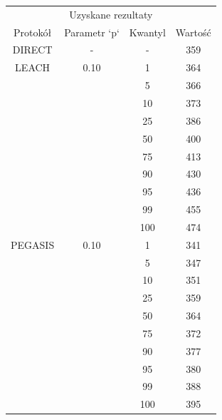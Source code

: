 \documentclass[a4paper,12pt,twoside,openany]{report}
\begin{document}
\begin{longtable}{*{4}{c}}
\toprule
\multicolumn{4}{c}{Uzyskane rezultaty} \\
Protokół	& Parametr `p`	& Kwantyl	& Wartość \\
\midrule
\endhead
DIRECT	& - 	& -	& 359 \\*
\midrule
LEACH	& 0.10	& 1	& 364 \\*
	&	& 5	& 366 \\*
	&	& 10	& 373 \\*
	&	& 25	& 386 \\*
	&	& 50	& 400 \\*
	&	& 75	& 413 \\*
	&	& 90	& 430 \\*
	&	& 95	& 436 \\*
	&	& 99	& 455 \\*
	&	& 100	& 474 \\*
\midrule
PEGASIS	& 0.10	& 1	& 341 \\*
	&	& 5	& 347 \\*
	&	& 10	& 351 \\*
	&	& 25	& 359 \\*
	&	& 50	& 364 \\*
	&	& 75	& 372 \\*
	&	& 90	& 377 \\*
	&	& 95	& 380 \\*
	&	& 99	& 388 \\*
	&	& 100	& 395 \\*
\bottomrule
\end{longtable}
\end{document}
